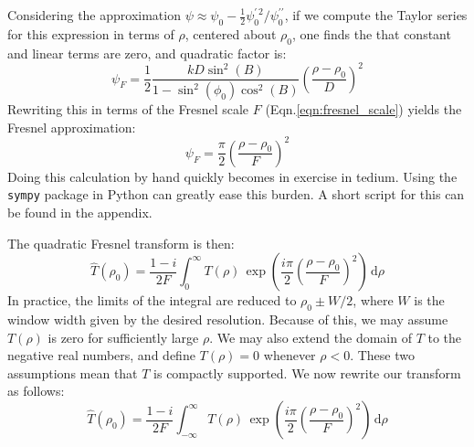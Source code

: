 \documentclass{article}
\begin{document}
        Considering the approximation
        $%
            \psi\approx%
            \psi_{0}-\frac{1}{2}\psi^{\prime\,2}_{0}/\psi^{\prime\prime}_{0}%
        $,
        if we compute the Taylor series for this expression in terms of
        $\rho$, centered about $\rho_{0}$, one finds the that constant and
        linear terms are zero, and quadratic factor is:
        \begin{equation}
            \psi_{F}=
            \frac{1}{2}
            \frac{kD\sin^{2}(B)}{1-\sin^{2}(\phi_{0})\cos^{2}(B)}
            \left(
                \frac{\rho-\rho_{0}}{D}
            \right)^{2}
        \end{equation}
        Rewriting this in terms of the Fresnel scale $F$
        (Eqn.\ref{eqn:fresnel_scale}) yields the Fresnel approximation:
        \begin{equation}
            \psi_{F}
            =\frac{\pi}{2}\left(
                \frac{\rho-\rho_{0}}{F}
            \right)^{2}
        \end{equation}
        Doing this calculation by hand quickly becomes in exercise in tedium.
        Using the \texttt{sympy} package in Python can greatly ease this burden.
        A short script for this can be found in the appendix.
        \par\hfill\par
        The quadratic Fresnel transform is then:
        \begin{equation}
            \hat{T}(\rho_{0})
            =\frac{1-i}{2F}\int_{0}^{\infty}
                T(\rho)\,\exp\left(
                    \frac{i\pi}{2}\left(\frac{\rho-\rho_{0}}{F}\right)^{2}
                \right)\,\textrm{d}\rho
        \end{equation}
        In practice, the limits of the integral are reduced to
        $\rho_{0}\pm{W}/2$, where $W$ is the window width given by the
        desired resolution. Because of this, we may assume
        $T(\rho)$ is zero for sufficiently large $\rho$.
        We may also extend the domain of $T$ to the negative real numbers, and
        define $T(\rho)=0$ whenever $\rho<0$. These two assumptions mean that
        $T$ is compactly supported. We now rewrite our transform as follows:
        \begin{equation}
            \hat{T}(\rho_{0})
            =\frac{1-i}{2F}\int_{-\infty}^{\infty}
                T(\rho)\,\exp\left(
                    \frac{i\pi}{2}\left(\frac{\rho-\rho_{0}}{F}\right)^{2}
                \right)\,\textrm{d}\rho
        \end{equation}
\end{document}
